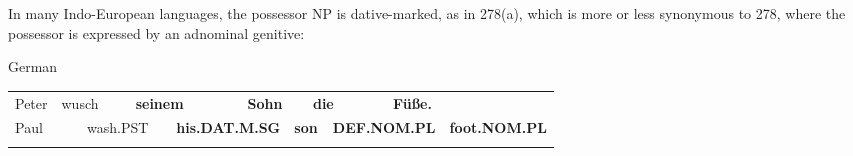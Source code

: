 \begin{styleBodytextC}
In many Indo-European languages, the possessor NP is dative-marked, as in 278(a), which is more or less synonymous to 278, where the possessor is expressed by an adnominal genitive:

\end{styleBodytextC}

\begin{listWWNumileveli}
\item {}

\begin{styleExample}
\label{bkm:Ref95294441}German

\end{styleExample}

\end{listWWNumileveli}

\begin{listWWNumlxxivleveli}
\item {}

\end{listWWNumlxxivleveli}

\begin{tabular}{llllllllllll}
\lsptoprule
Peter & \multicolumn{2}{l}{wusch

} & \multicolumn{2}{l}{{\bfseries seinem}

} & \multicolumn{2}{l}{{\bfseries Sohn}

} & \multicolumn{2}{l}{{\bfseries die}

} & \multicolumn{2}{l}{{\bfseries Füße.}

} & \\
\multicolumn{2}{l}{Paul

} & \multicolumn{2}{l}{wash.PST

} & \multicolumn{2}{l}{{\bfseries his.DAT.M.SG}

} & \multicolumn{2}{l}{{\bfseries son}

} & \multicolumn{2}{l}{{\bfseries DEF.NOM.PL}

} & \multicolumn{2}{l}{{\bfseries foot.NOM.PL}

}\\
\lspbottomrule
\end{tabular}


